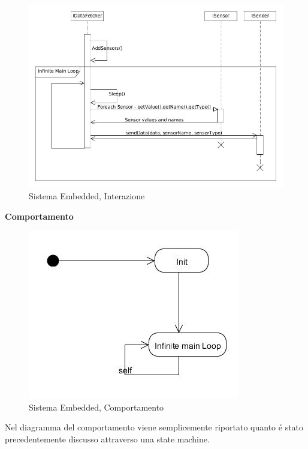 \begin{figure}[h]
\centering
\includegraphics[scale=0.4]{Figures/DomainModel/EmbeddedSystem/Interaction}
\caption{Sistema Embedded, Interazione}
\end{figure}

\newpage

\begin{center}
\textbf{Comportamento}
\end{center}

\begin{figure}[h]
\centering
\includegraphics[scale=0.5]{Figures/DomainModel/EmbeddedSystem/Behaviour}
\caption{Sistema Embedded, Comportamento}
\end{figure}


Nel diagramma del comportamento viene semplicemente riportato quanto \'e stato precedentemente discusso attraverso una state machine.

\newpage

